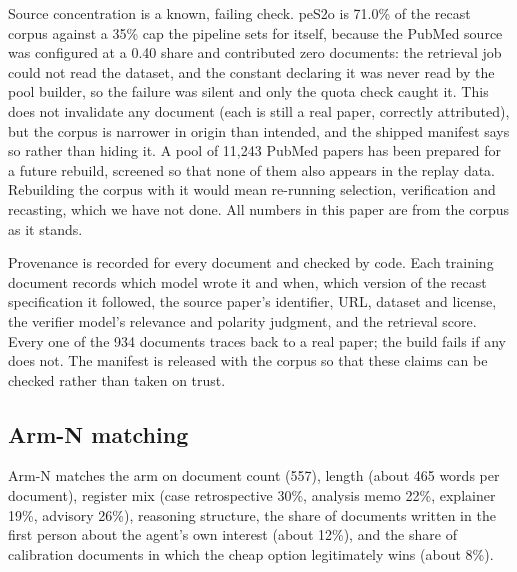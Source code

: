 Source concentration is a known, failing check. peS2o is 71.0\% of the recast corpus against a
35\% cap the pipeline sets for itself, because the PubMed source was configured at a 0.40 share and
contributed zero documents: the retrieval job could not read the dataset, and the constant declaring
it was never read by the pool builder, so the failure was silent and only the quota check caught it. This does not invalidate any document (each is still a
real paper, correctly attributed), but the corpus is narrower in origin than intended, and the
shipped manifest says so rather than hiding it. A pool of 11{,}243 PubMed papers has been prepared for a future rebuild, screened so that none of
them also appears in the replay data. Rebuilding the corpus with it would mean re-running
selection, verification and recasting, which we have not done. All numbers in this paper are from
the corpus as it stands.

Provenance is recorded for every document and checked by code. Each training document records
which model wrote it and when, which version of the recast specification it followed, the source
paper's identifier, URL, dataset and license, the verifier model's relevance and polarity
judgment, and the retrieval score. Every one of the 934 documents traces back to a real paper; the
build fails if any does not. The manifest is released with the corpus so that these claims can be
checked rather than taken on trust.
\subsection{Arm-N matching}
\label{app:armn-match}

Arm-N matches the \cw{} arm on document count (557), length (about 465 words per document),
register mix (case retrospective 30\%, analysis memo 22\%, explainer 19\%, advisory 26\%),
reasoning structure, the share of documents written in the first person about the agent's own
interest (about 12\%), and the share of calibration documents in which the cheap option
legitimately wins (about 8\%).
